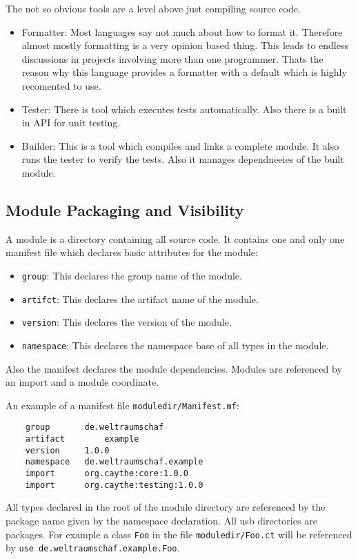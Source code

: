 \documentclass[a4paper,12pt]{article}
\begin{document}
The not so obvious tools are a level above just compiling source code.

\begin{itemize}
	\item Formatter: Most languages say not much about how to format it. Therefore almost mostly formatting is a very opinion based thing. This leads to endless discussions in projects involving more than one programmer. Thats the reason why this language provides a formatter with a default which is highly recomented to use.
	\item Tester: There is tool which executes tests automatically. Also there is a built in API for unit testing.
	\item Builder: This is a tool which compiles and links a complete module. It also runs the tester to verify the tests. Also it manages dependneeies of the built module.
\end{itemize}

\subsection{Module Packaging and Visibility}

A module is a directory containing all source code. It contains one and only one manifest file which declares basic attributes for the module:

\begin{itemize}
	\item \verb|group|: This declares the group name of the module.
 	\item \verb|artifct|: This declares the artifact name of the module.
 	\item \verb|version|: This declares the version of the module.
 	\item \verb|namespace|: This declares the namespace base of all types in the module.
\end{itemize}

Also the manifest declares the module dependencies. Modules are referenced by an import and a module coordinate.

An example of a manifest file \verb|moduledir/Manifest.mf|:
\begin{verbatim}
	group       de.weltraumschaf
	artifact	    example
	version     1.0.0
	namespace   de.weltraumschaf.example
	import      org.caythe:core:1.0.0
	import      org.caythe:testing:1.0.0
\end{verbatim}

All types declared in the root of the module directory are referenced by the package name given by the namespace declaration. All usb directories are packages. For example a class \verb|Foo| in the file \verb|moduledir/Foo.ct| will be referenced by \verb|use de.weltraumschaf.example.Foo|.
\end{document}
